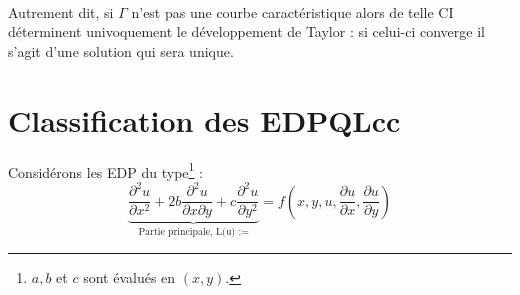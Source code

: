 \documentclass[11pt, a4paper, openany]{book}
\begin{document}
			 \ \\
			Autrement dit, si $\Gamma$ n'est pas une courbe caractéristique alors de telle CI déterminent univoquement le développement de Taylor : si celui-ci converge il s'agit d'une solution qui sera unique.
																
			\newpage
			\section{Classification des EDPQLcc}
			Considérons les EDP du type\footnote{$a,b$ et $c$ sont évalués en $(x,y)$.} :
			\begin{equation}
				\underbrace{\frac{\partial^2u}{\partial x^2} + 2b\frac{\partial^2u}{\partial x\partial y} + c\frac{\partial^2u}{\partial y^2}}_{\text{Partie principale, L(u) :=}} = f\left(x,y,u,\frac{\partial u}{\partial x}, \frac{\partial u}{\partial y}\right)
			\end{equation}
																
\end{document}

